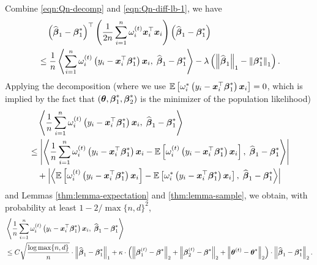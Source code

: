 Combine \eqref{eqn:Qn-decomp} and \eqref{eqn:Qn-diff-lb-1}, we have
\begin{equation}
\begin{aligned}
&\quad  \paren{\hat\bbeta_1-\bbeta_1^*}^\top 
\paren{\frac{1}{2n}\sum_{i=1}^n\omega_i^{(t)}\bx_i^\top\bx_i}
\paren{\hat\bbeta_1-\bbeta_1^*} \\
&\le 
\frac{1}{n}\angles{\sum_{i=1}^{n}\omega_i^{(t)}\paren{y_i-\bx_i^\top\bbeta_1^*} \bx_i,\; \hat\bbeta_1-\bbeta_1^*} - \lambda\paren{\norm{\hat\bbeta_1}_1-\norm{\bbeta_1^*}_1}.
\end{aligned}
\end{equation}
Applying the decomposition (where we use  $\EE\brackets{\omega_i^*\paren{y_i-\bx_i^\top\bbeta_1^*} \bx_i}=0$, which is implied by the fact that $(\btheta, \bbeta_1^*, \bbeta_2^*)$ is the minimizer of the population likelihood)
\begin{align*}
&\quad \angles{\frac{1}{n}\sum_{i=1}^{n}\omega_i^{(t)}\paren{y_i-\bx_i^\top\bbeta_1^*} \bx_i,\; \hat\bbeta_1-\bbeta_1^*} \\
& \le \abs{\angles{\frac{1}{n}\sum_{i=1}^{n}\omega_i^{(t)}\paren{y_i-\bx_i^\top\bbeta_1^*} \bx_i - \EE\brackets{\omega_i^{(t)}\paren{y_i-\bx_i^\top\bbeta_1^*} \bx_i},\; \hat\bbeta_1-\bbeta_1^*}} \\
& ~~~ + \abs{\angles{\EE\brackets{\omega_i^{(t)}\paren{y_i-\bx_i^\top\bbeta_1^*} \bx_i} - \EE\brackets{\omega_i^*\paren{y_i-\bx_i^\top\bbeta_1^*} \bx_i},\; \hat\bbeta_1-\bbeta_1^*}} \nonumber
\end{align*} 
and Lemmas \ref{thm:lemma-expectation} and \ref{thm:lemma-sample}, we obtain, with probability at least $1-2/\max\{n, d\}^2$, 
\begin{equation} \label{eqn:Qn-diff-ub}
\begin{aligned}
& \angles{\frac{1}{n}\sum_{i=1}^{n}\omega_i^{(t)}\paren{y_i-\bx_i^\top\bbeta_1^*} \bx_i,\; \hat\bbeta_1-\bbeta_1^*} \\
& \le  
C \sqrt{\frac{\log \max\{n, d\} }{ n}}\cdot\norm{\hat\bbeta_1-\bbeta_1^*}_1 
+ \kappa\cdot\paren{\norm{\bbeta_1^{(t)} - \bbeta^*}_2 + \norm{\bbeta_2^{(t)} - \bbeta^*}_2 + \norm{\btheta^{(t)} - \btheta^*}_2}\cdot\norm{\hat\bbeta_1-\bbeta_1^*}_2. 
\end{aligned}
\end{equation}

